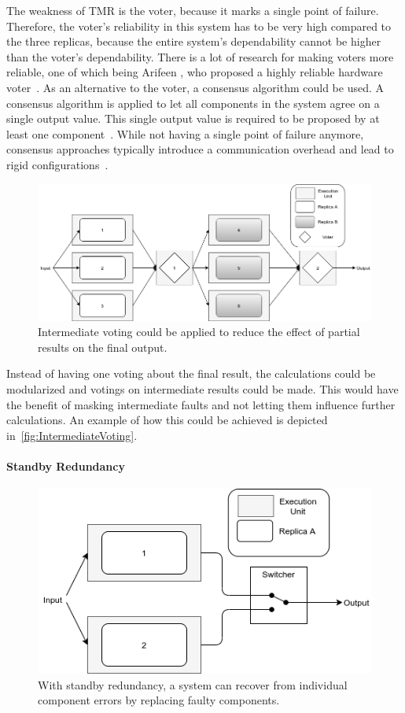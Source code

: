 The weakness of \gls*{TMR} is the voter, because it marks a single point of failure.
Therefore, the voter's reliability in this system has to be very high compared to the three replicas, because the entire system's dependability cannot be higher than the voter's dependability.
There is a lot of research for making voters more reliable, one of which being Arifeen \etal, who proposed a highly reliable hardware voter~\cite{ArifeenFaultTolerantTMR}.
As an alternative to the voter, a consensus algorithm could be used.
A consensus algorithm is applied to let all components in the system agree on a single output value.
This single output value is required to be proposed by at least one component~\cite{lamport2001paxos}.
While not having a single point of failure anymore, consensus approaches typically introduce a communication overhead and lead to rigid configurations~\cite{GamerIncreasingMOON}.

\begin{figure}[!hb]
	\centering
	\includegraphics[width=0.75\linewidth]{images/IntermediateVoting}
	\caption{Intermediate voting could be applied to reduce the effect of partial results on the final output.}
	\label{fig:IntermediateVoting}
\end{figure}

Instead of having one voting about the final result, the calculations could be modularized and votings on intermediate results could be made.
This would have the benefit of masking intermediate faults and not letting them influence further calculations.
An example of how this could be achieved is depicted in~\autoref{fig:IntermediateVoting}.

\paragraph{Standby Redundancy}
\begin{figure}[!hb]
	\centering
	\includegraphics[width=0.75\linewidth]{images/ActiveSelectionRedundancy}
	\caption{With standby redundancy, a system can recover from individual component errors by replacing faulty components.}
	\label{fig:StandbyRedundancy}
\end{figure}

